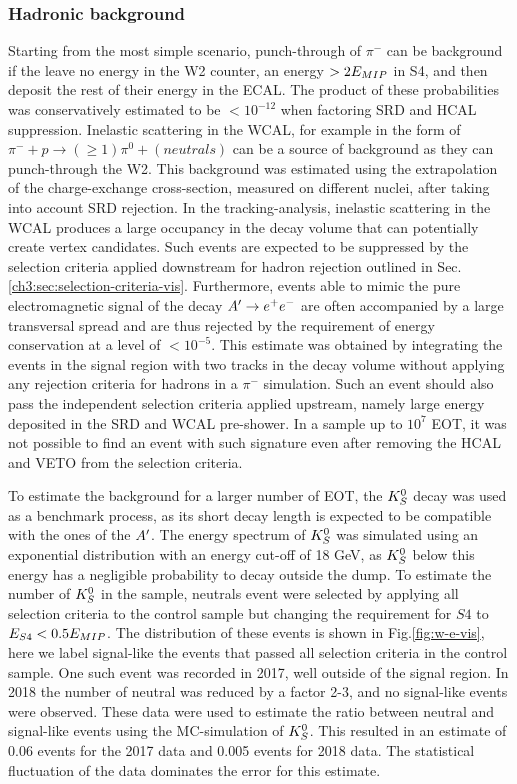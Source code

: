 \subsubsection{Hadronic background}
\label{ch3:sec:bkg:vis:hadr}

Starting from the most simple scenario, punch-through of $\pi^-$ can be background if the leave no energy in the W2 counter, an energy $> 2E_{MIP}$ in S4, and then deposit the rest of their energy in the ECAL. The product of these probabilities was conservatively estimated to be $< 10^{-12}$ when factoring SRD and HCAL suppression. Inelastic scattering in the WCAL, for example in the form of $\pi^- + p \rightarrow (\geq 1)\pi^0 + (neutrals)$ can be a source of background as they can punch-through the W2. This background was estimated using the extrapolation of the charge-exchange cross-section, measured on different nuclei, after taking into account SRD rejection. In the tracking-analysis, inelastic scattering in the WCAL produces a large occupancy in the decay volume that can potentially create vertex candidates. Such events are expected to be suppressed by the selection criteria applied downstream for hadron rejection outlined in Sec.\ref{ch3:sec:selection-criteria-vis}. Furthermore, events able to mimic the pure electromagnetic signal of the decay $A' \rightarrow e^+ e^-$ are often accompanied by a large transversal spread and are thus rejected by the requirement of energy conservation at a level of $< 10^{-5}$. This estimate was obtained by integrating the events in the signal region with two tracks in the decay volume without applying any rejection criteria for hadrons in a $\pi^-$ simulation. Such an event should also pass the independent selection criteria applied upstream, namely large energy deposited in the SRD and WCAL pre-shower. In a sample up to $10^7$ EOT, it was not possible to find an event with such signature even after removing the HCAL and VETO from the selection criteria.

To estimate the background for a larger number of EOT, the $K^0_S$ decay was used as a benchmark process, as its short decay length is expected to be compatible with the ones of the $A'$. The energy spectrum of $K^0_S$ was simulated using an exponential distribution with an energy cut-off of 18 GeV, as $K^0_S$ below this energy has a negligible probability to decay outside the dump. To estimate the number of $K^0_S$ in the sample, neutrals event were selected by applying all selection criteria to the control sample but changing the requirement for $S4$ to $E_{S4} < 0.5 E_{MIP}$. The distribution of these events is shown in Fig.\ref{fig:w-e-vis}, here we label signal-like the events that passed all selection criteria in the control sample. One such event was recorded in 2017, well outside of the signal region. In 2018 the number of neutral was reduced by a factor 2-3, and no signal-like events were observed. These data were used to estimate the ratio between neutral and signal-like events using the MC-simulation of $K^0_S$. This resulted in an estimate of 0.06 events for the 2017 data and 0.005 events for 2018 data. The statistical fluctuation of the data dominates the error for this estimate.

